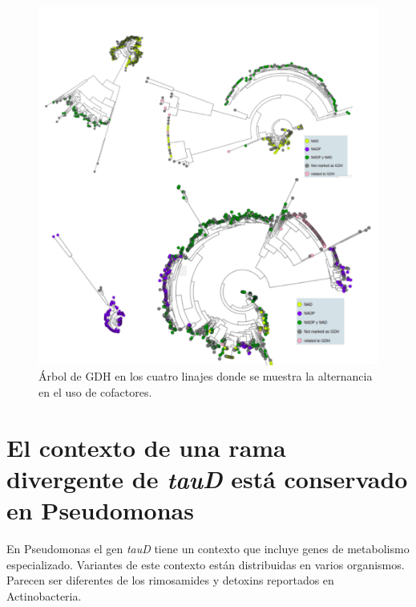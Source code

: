 \documentclass[12pt,twoside]{reedthesis}
\begin{document}
  \begin{figure}[h!tbp]
  \centering
  \includegraphics[angle = 0,scale = .8]{Anexos/GDHFactor.pdf}
  \caption[Árbol de GDH en los cuatro linajes donde se muestra la alternancia en el uso de cofactores.]{\footnotesize{Árbol de GDH en los cuatro linajes donde se muestra la alternancia en el uso de cofactores.}}
  \label{fig:GDHFactor}
  \end{figure}
  
  \section{\texorpdfstring{El contexto de una rama divergente de
  \emph{tauD} está conservado en
  Pseudomonas}{El contexto de una rama divergente de tauD está conservado en Pseudomonas}}\label{el-contexto-de-una-rama-divergente-de-taud-esta-conservado-en-pseudomonas}
  
  En Pseudomonas el gen \emph{tauD} tiene un contexto que incluye genes de
  metabolismo especializado. Variantes de este contexto están distribuidas
  en varios organismos. Parecen ser diferentes de los rimosamides y
  detoxins reportados en Actinobacteria.
  
\end{document}
